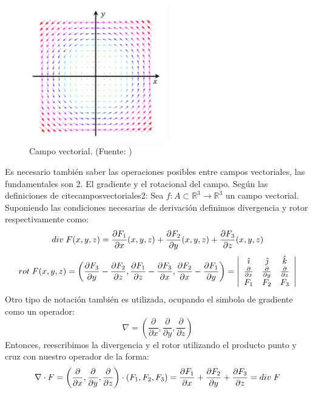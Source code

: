 \documentclass[11pt]{article}
\begin{document}
\begin{figure}[H]
\centering
\includegraphics[height=6cm]{Imagenes/campoveccolor.png}
\caption{Campo vectorial. (Fuente: \cite{camposvectoriales})}\label{fig:Campo vectorial en colores}
\end{figure}
Es necesario también saber las operaciones posibles entre campos vectoriales, las fundamentales son 2. El gradiente y el rotacional del campo. Según las definiciones de cite{camposvectoriales2}:
Sea $f:A\subset \mathbb{R}^3\rightarrow \mathbb{R}^3$ un campo vectorial. Suponiendo las condiciones necesarias de derivación definimos divergencia y rotor respectivamente como:
\begin{equation*} 
\mathnormal{div}\;F(x,y,z)=\frac{\partial F_1}{\partial x}(x,y,z)+\frac{\partial F_2}{\partial y}(x,y,z)+\frac{\partial F_3}{\partial z}(x,y,z)
\end{equation*}
\begin{equation*}
\mathnormal{rot}\;F(x,y,z)=\left(\frac{\partial F_3}{\partial y}-\frac{\partial F_2}{\partial z},\frac{\partial F_1}{\partial z}-\frac{\partial F_3}{\partial x},\frac{\partial F_2}{\partial x}-\frac{\partial F_1}{\partial y}\right)=  \left| {\begin{array}{ccc}
   \hat{\imath} & \hat{\jmath} & \hat{k} \\
   \frac{\partial}{\partial x} & \frac{\partial}{\partial y} & \frac{\partial}{\partial z} \\
   F_1 & F_2 & F_3 \\
  \end{array} } \right|
\end{equation*}
Otro tipo de notación también es utilizada, ocupando el simbolo de gradiente como un operador:
$$\nabla = \left(\frac{\partial}{\partial x},\frac{\partial}{\partial y},\frac{\partial}{\partial z}\right)$$
Entonces, reescribimos la divergencia y el rotor utilizando el producto punto y cruz con nuestro operador de la forma:
$$\nabla \cdot F = \left(\frac{\partial}{\partial x},\frac{\partial}{\partial y},\frac{\partial}{\partial z}\right) \cdot \left(F_1,F_2,F_3\right)=\frac{\partial F_1}{\partial x}+\frac{\partial F_2}{\partial y}+\frac{\partial F_3}{\partial z}=\mathnormal{div}\;F$$
\end{document}
